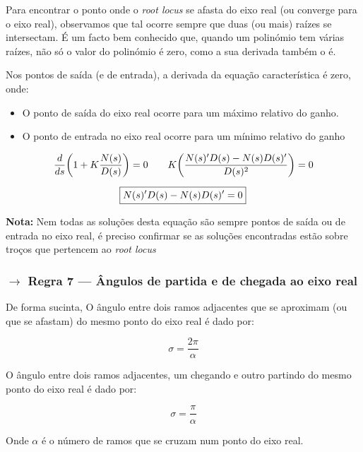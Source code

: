 \noindent Para encontrar o ponto onde o \textit{root locus} se afasta do eixo real (ou converge para o eixo real), observamos que tal ocorre sempre que duas (ou mais) raízes se intersectam.  É um facto bem conhecido que, quando um polinómio tem várias raízes, não só o valor do polinómio é zero, como a sua derivada também o é.

\vspace{1 em}
\noindent Nos pontos de saída (e de entrada), a derivada da equação característica é zero, onde:
\begin{itemize}
    \item O ponto de saída do eixo real ocorre para um máximo relativo do ganho.
    \item O ponto de entrada no eixo real ocorre para um mínimo relativo do ganho
\end{itemize}

$$
    \begin{aligned}
        \dfrac{d}{ds}\left(1 + K\dfrac{N(s)}{D(s)}\right) = 0\qquad
        &K \left(\dfrac{N(s)'D(s) - N(s)D(s)'}{D(s)^2}\right) = 0\\[6pt]
        \Aboxed{N(s)'D(s) &- N(s)D(s)' = 0}
    \end{aligned}
$$

\noindent\textbf{Nota:} Nem todas as soluções desta equação são sempre pontos de saída ou de entrada no eixo real, é preciso confirmar se as soluções encontradas estão sobre troços que pertencem ao \textit{root locus}

\subsubsection[3.3.7 Regra 7 --- Ângulos de partida e de chegada ao eixo real]{$\pmb{\rightarrow}$ Regra 7 --- Ângulos de partida e de chegada ao eixo real}

\noindent De forma sucinta, O ângulo entre dois ramos adjacentes que se aproximam (ou que se afastam) do mesmo ponto do eixo real é dado por:

$$
    \boxed{\sigma = \dfrac{2\pi}{\alpha}}
$$

\noindent O ângulo entre dois ramos adjacentes, um chegando e outro partindo do mesmo ponto do eixo real é dado por:

$$
    \boxed{\sigma = \dfrac{\pi}{\alpha}}
$$

\noindent Onde $\alpha$ é o número de ramos que se cruzam num ponto do eixo real.
